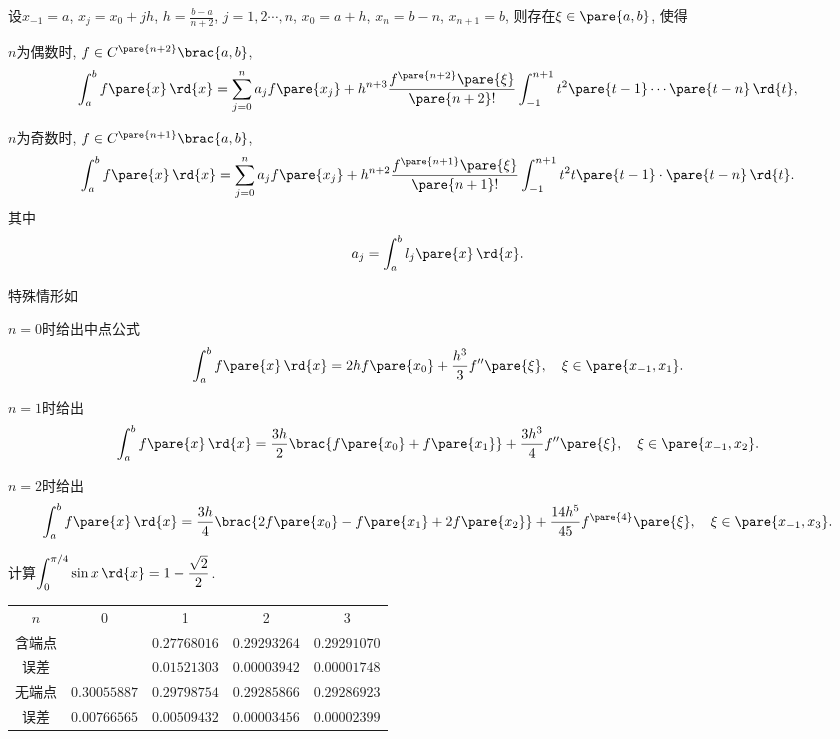 \documentclass[hidelinks]{ctexart}
\begin{document}
\begin{theorem}
    设$x_{-1} = a$, $x_j = x_0 + jh$, $\displaystyle h = \frac{b-a}{n+2}$, $j=1,2\cdots,n$, $x_0 = a+h$, $x_n = b-n$, $x_{n+1} = b$, 则存在$\xi \in \pare{a,b}$, 使得
    \begin{cenum}
        \item $n$为偶数时, $f\in C^{\pare{n+2}}\brac{a,b}$,
        \[ \int_a^b f\pare{x}\,\rd{x} = \sum_{j=0}^n a_j f\pare{x_j} + h^{n+3} \frac{f^{\pare{n+2}}\pare{\xi}}{\pare{n+2}!} \int_{-1}^{n+1} t^2\pare{t-1}\cdots\pare{t-n}\,\rd{t}, \]
        \item $n$为奇数时, $f\in C^{\pare{n+1}}\brac{a,b}$,
        \[ \int_a^b f\pare{x}\,\rd{x} = \sum_{j=0}^n a_j f\pare{x_j} + h^{n+2} \frac{f^{\pare{n+1}}\pare{\xi}}{\pare{n+1}!} \int_{-1}^{n+1} t^2t\pare{t-1}\cdot \pare{t-n}\,\rd{t}. \]
        其中
        \[ a_j = \int_a^b l_j\pare{x}\,\rd{x}. \]
    \end{cenum}
\end{theorem}
特殊情形如
\begin{cenum}
    \item $n=0$时给出中点公式
    \[ \int_a^b f\pare{x}\,\rd{x} = 2hf\pare{x_0} + \frac{h^3}{3}f''\pare{\xi},\quad \xi \in \pare{x_{-1},x_1}. \]
    \item $n=1$时给出
    \[ \int_a^b f\pare{x}\,\rd{x} = \frac{3h}{2}\brac{f\pare{x_0} + f\pare{x_1}} + \frac{3h^3}{4}f''\pare{\xi},\quad \xi \in \pare{x_{-1},x_2}. \]
    \item $n=2$时给出
    \[ \int_a^b f\pare{x}\,\rd{x} = \frac{3h}{4}\brac{2f\pare{x_0} - f\pare{x_1} + 2f\pare{x_2}} + \frac{14h^5}{45}f^{\pare{4}}\pare{\xi},\quad \xi \in \pare{x_{-1},x_3}. \]
\end{cenum}

\begin{ex}
    计算$\displaystyle \int_0^{\pi/4} \sin x\,\rd{x} = 1 - \frac{\sqrt{2}}{2}$.
    \begin{center}
        \begin{tabular}{ccccc}
            $n$ & 0 & 1 & 2 & 3 \\
            含端点 & & $0.27768016$ & $0.29293264$ & $0.29291070$ \\
            误差 & & $0.01521303$ & $0.00003942$ & $0.00001748$ \\
            无端点 & $0.30055887$ & $0.29798754$ & $0.29285866$ & $0.29286923$ \\
            误差 & $0.00766565$ & $0.00509432$ & $0.00003456$ & $0.00002399$
        \end{tabular}
    \end{center}
\end{ex}
\end{document}
